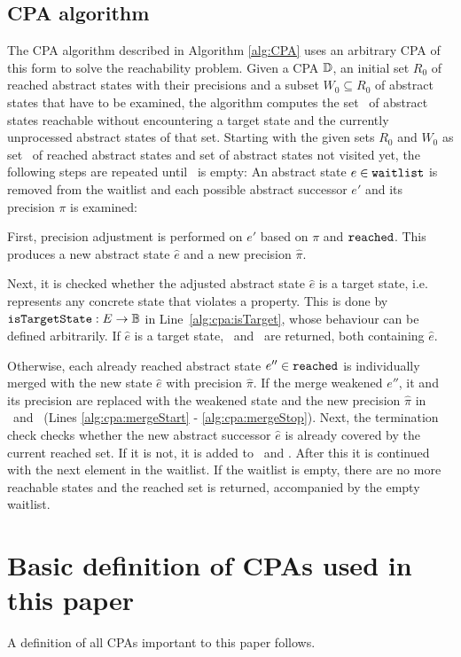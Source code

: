 \subsection{CPA algorithm}
The CPA algorithm described in Algorithm \ref{alg:CPA} uses an arbitrary CPA of this form to solve the reachability problem.
Given a CPA $\mathbb{D}$, an initial set $R_0$ of reached abstract states with their precisions and a subset $W_0 \subseteq R_0$ of abstract states that have to be examined,
the algorithm computes the set \reachedSet\ of abstract states reachable without encountering a target state and the currently unprocessed abstract states of that set.
Starting with the given sets $R_0$ and $W_0$ as set \reachedSet\ of reached abstract states and set \waitlistSet of abstract states not visited yet, the following steps are repeated until \waitlistSet\ is empty:
An abstract state $e \in \texttt{waitlist}$ is removed from the waitlist and each possible abstract successor $e'$ and its precision $\pi$ is examined:

First, precision adjustment is performed on $e'$ based on $\pi$ and $\texttt{reached}$. This produces a new abstract state $\hat{e}$ and a new precision $\hat{\pi}$.

Next, it is checked whether the adjusted abstract state $\hat{e}$ is a target state, i.e. represents any concrete state that violates a property. This is done by $\texttt{isTargetState} : E \rightarrow \mathbb{B}$ in Line~\ref{alg:cpa:isTarget}, whose behaviour can be defined arbitrarily.
If $\hat{e}$ is a target state, \reachedSet\ and \waitlistSet\ are returned, both containing $\hat{e}$.

Otherwise, each already reached abstract state $e'' \in \texttt{reached}$ is individually merged with the new state $\hat{e}$ with precision $\hat{\pi}$. If the merge weakened $e''$, it and its precision are replaced with the weakened state and the new precision $\hat{\pi}$ in \reachedSet\ and \waitlistSet\ (Lines \ref{alg:cpa:mergeStart} - \ref{alg:cpa:mergeStop}).
Next, the termination check checks whether the new abstract successor $\hat{e}$ is already covered by the current reached set.
If it is not, it is added to \waitlistSet\ and \reachedSet.
After this it is continued with the next element in the waitlist.
If the waitlist is empty, there are no more reachable states and the reached set is returned, accompanied by the empty waitlist.

\section{Basic definition of CPAs used in this paper}
A definition of all CPAs important to this paper follows.


